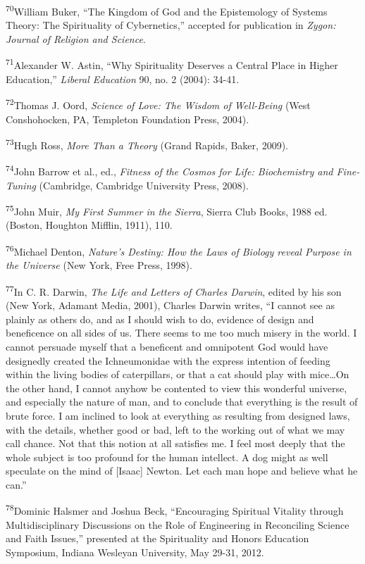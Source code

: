 \textsuperscript{70}William Buker, “The Kingdom of God and the
Epistemology of Systems Theory: The Spirituality of Cybernetics,”
accepted for publication in \textit{Zygon: Journal of Religion and
Science}.


\textsuperscript{71}Alexander W. Astin, “Why Spirituality Deserves a
Central Place in Higher Education,” \textit{Liberal Education} 90, no.
2 (2004): 34-41.


\textsuperscript{72}Thomas J. Oord, \textit{Science of Love: The Wisdom
of Well-Being }(West Conshohocken, PA, Templeton Foundation Press,
2004).


\textsuperscript{73}Hugh Ross, \textit{More Than a Theory }(Grand
Rapids, Baker, 2009).


\textsuperscript{74}John Barrow et al., ed., \textit{Fitness of the
Cosmos for Life: Biochemistry and Fine-Tuning }(Cambridge, Cambridge
University Press, 2008).


\textsuperscript{75}John Muir, \textit{My First Summer in the Sierra},
Sierra Club Books, 1988 ed.\textit{ }(Boston, Houghton Mifflin, 1911),
110.


\textsuperscript{76}Michael Denton, \textit{Nature’s Destiny: How the
Laws of Biology reveal Purpose in the Universe }(New York, Free Press,
1998).


\textsuperscript{77}In C. R. Darwin, \textit{The Life and Letters of
Charles Darwin}, edited by his son\textit{ }(New York, Adamant Media,
2001), Charles Darwin writes, “I cannot see as plainly as others do,
and as I should wish to do, evidence of design and beneficence on all
sides of us. There seems to me too much misery in the world.  I cannot
persuade myself that a beneficent and omnipotent God would have
designedly created the Ichneumonidae with the express intention of
feeding within the living bodies of caterpillars, or that a cat should
play with mice…On the other hand, I cannot anyhow be contented to view
this wonderful universe, and especially the nature of man, and to
conclude that everything is the result of brute force. I am inclined to
look at everything as resulting from designed laws, with the details,
whether good or bad, left to the working out of what we may call
chance. Not that this notion at all satisfies me. I feel most deeply
that the whole subject is too profound for the human intellect. A dog
might as well speculate on the mind of [Isaac] Newton. Let each man
hope and believe what he can.”


\textsuperscript{78}Dominic Halsmer and Joshua Beck, “Encouraging
Spiritual Vitality through Multidisciplinary Discussions on the Role of
Engineering in Reconciling Science and Faith Issues,” presented at the
Spirituality and Honors Education Symposium, Indiana Wesleyan
University, May 29-31, 2012.


